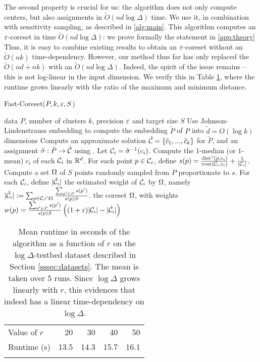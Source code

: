 The second property is crucial for us: the algorithm does not only compute centers, but also assignments in $\tilde{O}(nd\log \Delta)$ time.  We use it, in
combination with sensitivity sampling, as described in \cref{alg:main}.  This algorithm computes an $\varepsilon$-coreset in time $\tilde O(nd \log \Delta)$: we prove
formally the statement in \cref{app:theory} Thus, it is easy to combine existing results to obtain an $\varepsilon$-coreset without an $\tilde{O}(nk)$ time-dependency.
However, our method thus far has only replaced the $\tilde{O}(nd + nk)$ with an $\tilde{O}(nd \log \Delta)$. Indeed, the spirit of the issue remains -- this is
not log-linear in the input dimension.  We verify this in Table \ref{tbl:logdelta}, where the runtime grows linearly with the ratio of the maximum and minimum
distance.

\begin{algorithm}[tb]
   \caption{Fast-Coreset($P, k, \varepsilon, S$)}
   \label{alg:main}
\begin{algorithmic}[1]
    data $P$, number of clusters $k$, precision $\varepsilon$ and target size $S$
   \State Use Johnson-Lindenstrauss embedding to compute the embedding $\tilde P$ of $P$ into $\tilde d = O(\log k)$ dimensions
   \State Compute an approximate solution $\tilde {\mathcal C} = \left\{ \tilde c_1, ..., \tilde c_k\right\} $ for $\tilde P$, and an assignment $\tilde \sigma : \tilde P \rightarrow \tilde {\mathcal C}$ using \fkmeans.	
   \State Let $\mathcal C_i = \tilde \sigma^{-1}(c_i)$. Compute the $1$-median (or $1$-mean) $c_i$ of each $\mathcal C_i$ in $\mathbb{R}^d$.%
   \State For each point $p \in \mathcal C_i$, define
   $s(p) = \frac{\operatorname{dist}^z(p, c_i)}{\operatorname{cost}(\mathcal C_i, c_i)}+ \frac{1}{|\mathcal C_i|}$.
   \State Compute a set $\Omega$ of $S$ points randomly sampled from $P$ proportionate to $s$.
   \State For each $\mathcal C_i$, define $|\hat {\mathcal C}_i|$ the estimated weight of $\mathcal C_i$ by $\Omega$, namely $|\hat {\mathcal C}_i| := \sum_{p \in \mathcal C_i \cap \Omega} \frac{\sum_{p' \in P}s(p')}{s(p)S}$.
    the coreset $\Omega$, with weights $w(p) = \frac{\sum_{p' \in P}s(p')}{s(p)S} \left( (1+\varepsilon)|\mathcal C_i| - |\hat {\mathcal C}_i|\right)$
\end{algorithmic}
\end{algorithm}

\begin{table}[htbp]
    \centering
    \begin{tabular}{lrrrr}
        \hline
        Value of $r$ & 20 & 30 & 40 & 50 \\
        Runtime (s) & 13.5 & 14.3 & 15.7 & 16.1 \\
        \hline
        \vspace*{0.1cm}
    \end{tabular}
    \caption{Mean runtime in seconds of the \fkmeans algorithm as a function of $r$ on the $\log \Delta$-testbed dataset described in Section
    \ref{sssec:datasets}. The mean is taken over 5 runs.  Since $\log \Delta$ grows linearly with $r$, this evidences that \fkmeans indeed has a linear
    time-dependency on $\log \Delta$.}
    \label{tbl:logdelta}
\end{table}

